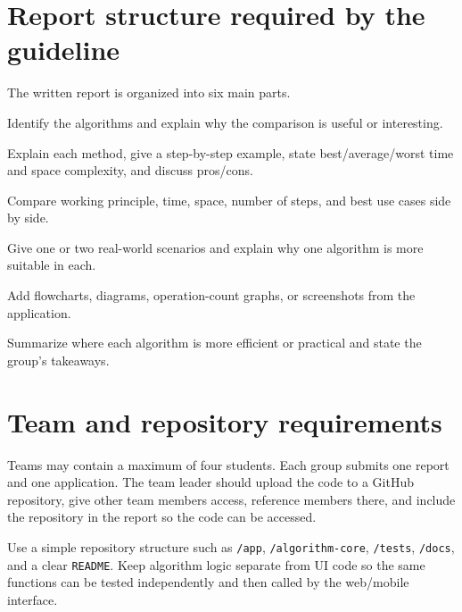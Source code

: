 \section{Report structure required by the guideline}

The written report is organized into six main parts.

\begin{description}[leftmargin=1.25in,style=nextline]
  \item[A. Introduction] Identify the algorithms and explain why the comparison is useful or interesting.
  \item[B. Algorithm Explanation] Explain each method, give a step-by-step example, state best/average/worst time and space complexity, and discuss pros/cons.
  \item[C. Comparison Table] Compare working principle, time, space, number of steps, and best use cases side by side.
  \item[D. Use Case Comparison] Give one or two real-world scenarios and explain why one algorithm is more suitable in each.
  \item[E. Visual Aid (optional)] Add flowcharts, diagrams, operation-count graphs, or screenshots from the application.
  \item[F. Conclusion] Summarize where each algorithm is more efficient or practical and state the group's takeaways.
\end{description}

\section{Team and repository requirements}

\begin{projectrequirement}
Teams may contain a maximum of four students. Each group submits one report and one application. The team leader should upload the code to a GitHub repository, give other team members access, reference members there, and include the repository in the report so the code can be accessed.
\end{projectrequirement}

\begin{recommendedworkflow}
Use a simple repository structure such as \texttt{/app}, \texttt{/algorithm-core}, \texttt{/tests}, \texttt{/docs}, and a clear \texttt{README}. Keep algorithm logic separate from UI code so the same functions can be tested independently and then called by the web/mobile interface.
\end{recommendedworkflow}

